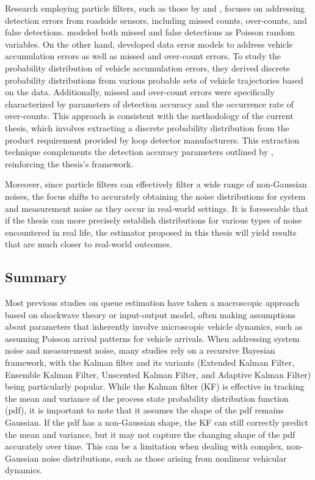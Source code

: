 Research employing particle filters, such as those by \textcite{mihaylova2007freeway} and \textcite{xie2018generic}, focuses on addressing detection errors from roadside sensors, including missed counts, over-counts, and false detections. \textcite{mihaylova2007freeway} modeled both missed and false detections as Poisson random variables. On the other hand, \textcite{xie2018generic} developed data error models to address vehicle accumulation errors as well as missed and over-count errors. To study the probability distribution of vehicle accumulation errors, they derived discrete probability distributions from various probable sets of vehicle trajectories based on the data. Additionally, missed and over-count errors were specifically characterized by parameters of detection accuracy and the occurrence rate of over-counts. This approach is consistent with the methodology of the current thesis, which involves extracting a discrete probability distribution from the product requirement provided by loop detector manufacturers. This extraction technique complements the detection accuracy parameters outlined by \textcite{xie2018generic}, reinforcing the thesis's framework. 

Moreover, since particle filters can effectively filter a wide range of non-Gaussian noises, the focus shifts to accurately obtaining the noise distributions for system and measurement noise as they occur in real-world settings. It is foreseeable that if the thesis can more precisely establish distributions for various types of noise encountered in real life, the estimator proposed in this thesis will yield results that are much closer to real-world outcomes.

\subsection{Summary}\label{queue estimation summary}
Most previous studies on queue estimation have taken a macroscopic approach based on shockwave theory or input-output model, often making assumptions about parameters that inherently involve microscopic vehicle dynamics, such as assuming Poisson arrival patterns for vehicle arrivals. When addressing system noise and measurement noise, many studies rely on a recursive Bayesian framework, with the Kalman filter and its variants (Extended Kalman Filter, Ensemble Kalman Filter, Unscented Kalman Filter, and Adaptive Kalman Filter) being particularly popular. While the Kalman filter (KF) is effective in tracking the mean and variance of the process state probability distribution function (pdf), it is important to note that it assumes the shape of the pdf remains Gaussian. If the pdf has a non-Gaussian shape, the KF can still correctly predict the mean and variance, but it may not capture the changing shape of the pdf accurately over time. This can be a limitation when dealing with complex, non-Gaussian noise distributions, such as those arising from nonlinear vehicular dynamics.

